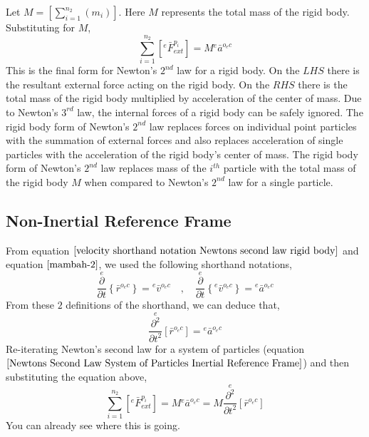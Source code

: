 Let $\displaystyle M = \left[\sum^{n_{2}}_{i = 1}\left(m_{i}\right)\right]$. 
Here $M$ represents the total mass of the rigid body. 
Substituting for $M$,
\begin{equation}
\sum^{n_{2}}_{i = 1}\left[{}^{e}\bar{F}^{p_{i}}_{ext}\right] = M{}^{e}\bar{a}^{o_{e}c}
\label{Newtons Second Law System of Particles Inertial Reference Frame}
\end{equation}
This is the final form for Newton's $2^{nd}$ law for a rigid body. 
On the $LHS$ there is the resultant external force acting on the rigid body. 
On the $RHS$ there is the total mass of the rigid body multiplied by acceleration of the center of mass. 
Due to Newton's $3^{rd}$ law, the internal forces of a rigid body can be safely ignored. 
The rigid body form of Newton's $2^{nd}$ law replaces forces on individual point particles with the summation of external forces and also replaces acceleration of single particles with the acceleration of the rigid body's center of mass. 
The rigid body form of Newton's $2^{nd}$ law replaces mass of the $i^{th}$ particle with the total mass of the rigid body $M$ when compared to Newton's $2^{nd}$ law for a single particle.
\subsection{Non-Inertial Reference Frame}
\label{non-inertial newtons second law system of particles section}
\begin{comment}
\end{comment}
From equation $\ref{velocity shorthand notation Newtons second law rigid body}$ and equation $\ref{mambah-2}$, we used the following shorthand notations,
$$\overset{e}{\frac{\partial}{\partial t}}\left\{\bar{r}^{o_{e}c}\right\} = {}^{e}\bar{v}^{o_{e}c} \quad,\quad 
\overset{e}{\frac{\partial}{\partial t}}\left\{{}^{e}\bar{v}^{o_{e}c}\right\} = {}^{e}\bar{a}^{o_{e}c}$$
From these $2$ definitions of the shorthand, we can deduce that,
$$\overset{e}{\frac{\partial^{2}}{\partial t^{2}}}[\bar{r}^{o_{e}c}] = {}^{e}\bar{a}^{o_{e}c}$$
Re-iterating Newton's second law for a system of particles (equation $\ref{Newtons Second Law System of Particles Inertial Reference Frame}$) and then substituting the equation above,
\begin{equation}
\sum^{n_{2}}_{i = 1}\left[{}^{e}\bar{F}^{p_{i}}_{ext}\right] = M{}^{e}\bar{a}^{o_{e}c} = M\overset{e}{\frac{\partial^{2}}{\partial t^{2}}}[\bar{r}^{o_{e}c}]
\label{Newtons second law verbose rigid system intermediate}
\end{equation}
You can already see where this is going. 

